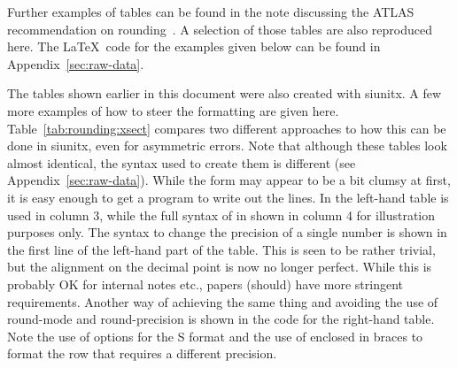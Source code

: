 \documentclass[UKenglish,texlive=2016]{\ATLASLATEXPATH atlasdoc}
\begin{document}
Further examples of tables can be found in the note discussing the ATLAS recommendation on rounding~\cite{atlas-rounding}.
A selection of those tables are also reproduced here.
The \LaTeX\ code for the examples given below can be found in
Appendix~\ref{sec:raw-data}.

The tables shown earlier in this document were also created with \textsf{siunitx}.
A few more examples of how to steer the formatting are given here.
Table~\ref{tab:rounding:xsect} compares two different approaches
to how this can be done  in \textsf{siunitx}, even for asymmetric errors.  Note that although these
tables look almost identical, the syntax used to create them is different (see Appendix~\ref{sec:raw-data}).
While the form may appear to be a bit clumsy at first, it is easy enough to get a
program to write out the lines. In the left-hand table
 is used in column 3, while the full syntax of 
in shown in column 4 for illustration purposes only.  The syntax
to change the precision of a single number is shown in the first line of
the left-hand part of the table. This is seen to be rather
trivial, but the alignment on the decimal point is now no longer
perfect. While this is probably OK for internal notes etc., papers
(should) have more stringent requirements. Another way of achieving
the same thing and avoiding the use of \textsf{round-mode} and
\textsf{round-precision} is shown in the code for the right-hand table. Note the
use of options for the \textsf{S} format and the use of  enclosed
in braces to format the row that requires a different precision.
\end{document}

